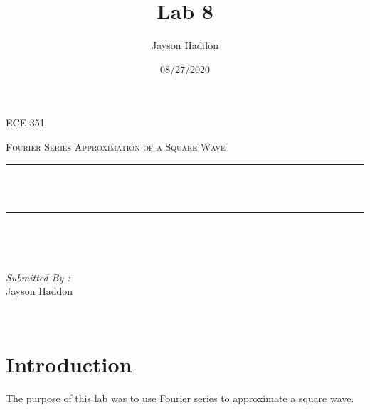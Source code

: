 \documentclass[11pt,a4]{report}
\title{Lab 8}
\author{Jayson Haddon}
\date{08/27/2020}
\makeatletter
\let\thetitle\@title
\makeatother
\begin{document}

\begin{titlepage}
	\centering
    \vspace*{0.5 cm}
\begin{center}    \textsc{\Large   ECE 351 }\\[2.0 cm]	\end{center}%
	\textsc{\Large Fourier Series Approximation of a Square Wave  }\\[0.5 cm]				%
	\rule{\linewidth}{0.2 mm} \\[0.4 cm]
	{ \huge \bfseries \thetitle}\\
	\rule{\linewidth}{0.2 mm} \\[1.5 cm]
	
	\begin{minipage}{0.4\textwidth}
		\begin{flushleft} \large
			\end{flushleft}
			\end{minipage}~
			\begin{minipage}{0.4\textwidth}
            
			\begin{flushright} \large
			\emph{Submitted By :} \\
			Jayson Haddon  
		\end{flushright}
           
	\end{minipage}\\[2 cm]
	
    
    
    
    
	
\end{titlepage}

\tableofcontents
\pagebreak

\renewcommand{\thesection}{\arabic{section}}
\section{Introduction}
The purpose of this lab was to use Fourier series to approximate a square wave. 
\end{document}
